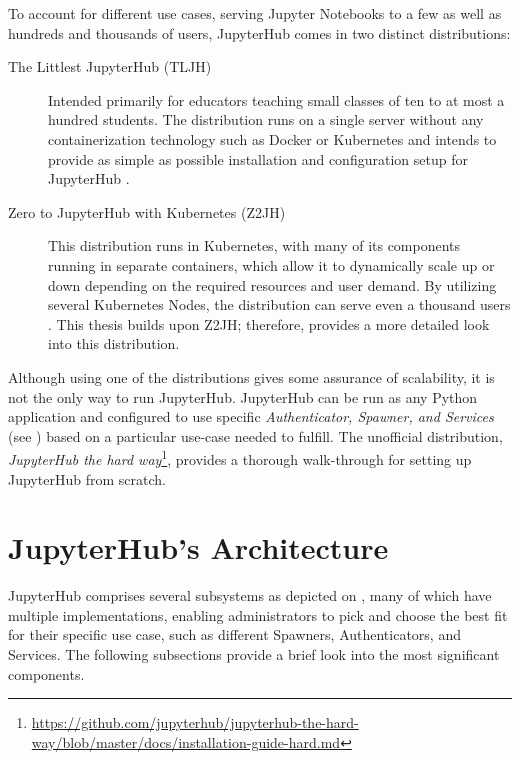 \documentclass[
  digital,     %
  oneside,     %
  nosansbold,  %
  nocolorbold, %
  lof,         %
  nolot,         %
]{fithesis4}
\begin{document}
To account for different use cases, serving Jupyter Notebooks to a few as well as hundreds and thousands of users, JupyterHub comes in two distinct distributions:
\begin{description}

    \item[The Littlest JupyterHub (TLJH)]
    Intended primarily for educators teaching small classes of ten to at most a hundred students. The distribution runs on a single server without any containerization technology such as Docker or Kubernetes and intends to provide as simple as possible installation and configuration setup for JupyterHub \cite{littlest_jupyterhub}.

    \item[Zero to JupyterHub with Kubernetes (Z2JH)]
    This distribution runs in Kubernetes, with many of its components running in separate containers, which allow it to dynamically scale up or down depending on the required resources and user demand. By utilizing several Kubernetes Nodes, the distribution can serve even a thousand users \cite{jupyterhub}. This thesis builds upon Z2JH; therefore,  provides a more detailed look into this distribution.
    
\end{description}

Although using one of the distributions gives some assurance of scalability, it is not the only way to run JupyterHub. JupyterHub can be run as any Python application and configured to use specific \emph{Authenticator, Spawner, and Services} (see ) based on a particular use-case needed to fulfill. The unofficial distribution, \emph{JupyterHub the hard way}\footnote{\url{https://github.com/jupyterhub/jupyterhub-the-hard-way/blob/master/docs/installation-guide-hard.md}}, provides a thorough walk-through for setting up JupyterHub from scratch.


\section{JupyterHub's Architecture}
\label{subsec:jupyterhub:architecture}
JupyterHub comprises several subsystems as depicted on , many of which have multiple implementations, enabling administrators to pick and choose the best fit for their specific use case, such as different Spawners, Authenticators, and Services. The following subsections provide a brief look into the most significant components.
\end{document}
